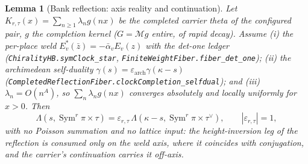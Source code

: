 \documentclass[11pt]{article}
\newtheorem{lemma}[theorem]{Lemma}
\theoremstyle{definition}
\newcommand{\Sym}{\operatorname{Sym}}
\begin{document}
\begin{lemma}[Bank reflection: axis reality and continuation]\label{lem:bankreflection}
Let $K_{r,\tau}(x)=\sum_{n\ge1}\lambda_n g(nx)$ be the completed carrier theta of the configured pair, $g$ the
completion kernel ($G=\mathcal M g$ entire, of rapid decay). Assume \emph{(i)} the per-place weld
$E_v^{*}(\bar z)=-\bar\alpha_v E_v(z)$ with the det-one ledger (\texttt{ChiralityHB.symClock\_star},
\texttt{FiniteWeightFiber.fiber\_det\_one}); \emph{(ii)} the archimedean self-duality
$\gamma(s)=\varepsilon_{\mathrm{arch}}\gamma(\kappa-s)$
(\texttt{CompletedReflectionFiber.clockCompletion\_selfdual}); and \emph{(iii)} $\lambda_n=O(n^{A})$, so
$\sum_n\lambda_n g(nx)$ converges absolutely and locally uniformly for $x>0$. Then
\[
  \Lambda(s,\Sym^r\pi\times\tau)=\varepsilon_{r,\tau}\,\Lambda(\kappa-s,\Sym^r\pi\times\tau^\vee),
  \qquad|\varepsilon_{r,\tau}|=1,
\]
with \emph{no Poisson summation and no lattice input}: the height-inversion leg of the reflection is consumed
only on the weld axis, where it coincides with conjugation, and the carrier's continuation carries it off-axis.
\end{lemma}
\end{document}
